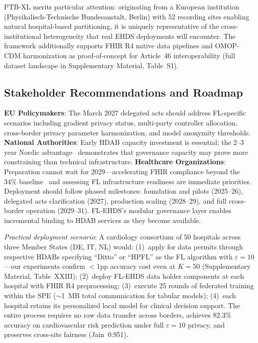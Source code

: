 \documentclass[conference,a4paper]{IEEEtran}
\begin{document}
PTB-XL merits particular attention: originating from a European institution (Physikalisch-Technische Bundesanstalt, Berlin) with 52 recording sites enabling natural hospital-based partitioning, it is uniquely representative of the cross-institutional heterogeneity that real EHDS deployments will encounter. The framework additionally supports FHIR R4 native data pipelines and OMOP-CDM harmonization as proof-of-concept for Article~46 interoperability (full dataset landscape in Supplementary Material, Table~S1).

\subsection{Stakeholder Recommendations and Roadmap}

\textbf{EU Policymakers}: The March 2027 delegated acts should address FL-specific scenarios including gradient privacy status, multi-party controller allocation, cross-border privacy parameter harmonization, and model anonymity thresholds. \textbf{National Authorities}: Early HDAB capacity investment is essential; the 2--3 year Nordic advantage~\cite{tehdas2024ready} demonstrates that governance capacity may prove more constraining than technical infrastructure. \textbf{Healthcare Organizations}: Preparation cannot wait for 2029---accelerating FHIR compliance beyond the 34\% baseline~\cite{hussein2025interop} and assessing FL infrastructure readiness are immediate priorities. Deployment should follow phased milestones: foundation and pilots (2025--26), delegated acts clarification (2027), production scaling (2028--29), and full cross-border operation (2029--31). FL-EHDS's modular governance layer enables incremental binding to HDAB services as they become available.

\textit{Practical deployment scenario}: A cardiology consortium of 50 hospitals across three Member States (DE, IT, NL) would: (1)~apply for data permits through respective HDABs specifying ``Ditto'' or ``HPFL'' as the FL algorithm with $\varepsilon{=}10$---our experiments confirm $<$1pp accuracy cost even at $K{=}50$ (Supplementary Material, Table~XXIII); (2)~deploy FL-EHDS data holder components at each hospital with FHIR R4 preprocessing; (3)~execute 25 rounds of federated training within the SPE ($\sim$1~MB total communication for tabular models); (4)~each hospital retains its personalized local model for clinical decision support. The entire process requires no raw data transfer across borders, achieves 82.3\% accuracy on cardiovascular risk prediction under full $\varepsilon{=}10$ privacy, and preserves cross-site fairness (Jain~0.951).
\end{document}
